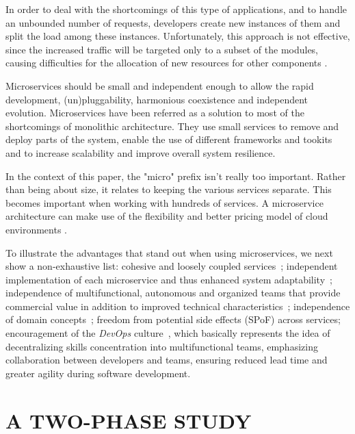 \documentclass[a4paper,twoside]{article}
\begin{document}
In order to deal with the shortcomings of this type of applications, and to handle an unbounded number of requests, developers create new instances of them and split the load among these instances. Unfortunately, this approach is not effective, since the increased traffic will be targeted only to a subset of the modules, causing difficulties for the allocation of new resources for other components \cite{dragoni2017microservices}.

Microservices should be small and independent enough to allow the rapid development, (un)pluggability, harmonious coexistence and independent evolution. Microservices have been referred as a solution to most of the shortcomings of monolithic architecture. They use small services to remove and deploy parts of the system, enable the use of different frameworks and tookits and to increase scalability and improve overall system resilience.

In the context of this paper, the "micro" prefix isn't really too important. Rather than being about size, it relates to keeping the various services separate. This becomes important when working with hundreds of services.
A microservice architecture can make use of the flexibility and better pricing model of cloud environments \cite{balalaie2016microservices}.

To illustrate the advantages that stand out when using microservices, we next show a non-exhaustive list: cohesive and loosely coupled services~\cite{wolff2016microservices}; independent implementation of each microservice and thus enhanced system adaptability~\cite{millett2015patterns}; independence of multifunctional, autonomous and organized teams that provide commercial value in addition to improved technical characteristics~\cite{millett2015patterns}; independence of domain concepts~\cite{wolff2016microservices}; freedom from potential side effects (SPoF) across services; encouragement of the \textit{DevOps} culture~\cite{balalaie2016microservices}, which basically represents the idea of decentralizing skills concentration into multifunctional teams, emphasizing collaboration between developers and teams, ensuring reduced lead time and greater agility during software development. 

\section{\uppercase{A Two-phase Study}}
\label{sec:twophase}
\end{document}
